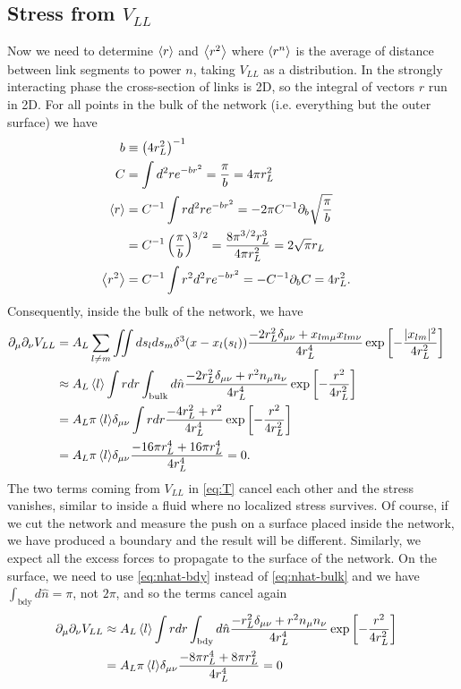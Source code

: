 \documentclass[endfloats,nofootinbib,preprint,floatfix,titlepage,superscriptaddress,linenumbers]{revtex4-1} %
\begin{document}
\subsection{Stress from $V_{LL}$}
Now we need to determine $\left<r\right>$ and $\left<r^2\right>$ where $\left<r^n\right>$ is the average of distance between link segments to power $n$, taking $V_{LL}$ as a distribution. 
In the strongly interacting phase the %
cross-section of links is 2D, so the integral of vectors $r$ run in 2D. 
For all points in the bulk of the network (i.e. everything but the outer surface) we have
\begin{align}
b &\equiv \left(4r_L^2\right)^{-1}\cr
C &= \int d^2 r e^{-br^2} = {\pi\over b} = 4\pi r_L^2 \cr
\left<r\right> &= C^{-1}\int r d^2 r e^{-br^2} = - 2\pi C^{-1}\partial_b \sqrt{{\pi\over b}} \cr &= C^{-1} \left({\pi\over b}\right)^{3/2}    = {8\pi^{3/2} r_L^3\over 4 \pi r_L^2} = 2\sqrt{\pi} r_L \cr
\left<r^2\right> &= C^{-1}\int r^2 d^2 r e^{-b r^2} = - C^{-1}\partial_b C = 4r_L^2.
\end{align}
%
Consequently, inside the bulk of the network, we have 
\begin{align}
    \partial_\mu\partial_\nu V_{LL} & = A_L\sum_{l\ne m} \iint ds_l ds_m \delta^3(x-x_l(s_l))\frac{-2r_L^2\delta_{\mu\nu}+ x_{lm\mu} x_{lm\nu}}{4r_L^4}
    \exp\left[- {|x_{lm}|^2 \over 4 r_L^2}\right]\cr 
    & \approx {A_L\left<l\right>} \int r dr \int_\mathrm{bulk} d\hat{n} \frac{-2r_L^2\delta_{\mu\nu}+ r^2 n_\mu n_\nu}{4r_L^4}
    \exp\left[- {r^2 \over 4 r_L^2}\right]\cr
    &= {A_L\pi\left<l\right>} \delta_{\mu\nu} \int r dr  \frac{-4 r_L^2+ r^2 }{4r_L^4}
    \exp\left[- {r^2 \over 4 r_L^2}\right]\cr
    &= {A_L\pi\left<l\right>} \delta_{\mu\nu}  \frac{-16\pi r_L^4+ 16\pi r_L^4 }{4r_L^4} = 0 .
    \label{eq:stress-bulk}
\end{align}
The two terms coming from $V_{LL}$ in \eqref{eq:T} cancel each other and the stress vanishes, similar to inside a fluid where no localized stress survives. 
Of course, if we cut the network and measure the push on a surface placed inside the network, we have produced a boundary and the result will be different. 
Similarly, we expect all the excess forces to propagate to the surface of the network. 
On the surface, we need to use \eqref{eq:nhat-bdy}  instead of \eqref{eq:nhat-bulk} and we have $\int_\mathrm{bdy} d\hat{n} = \pi $, not $2\pi$, and so the terms cancel again
\begin{align}
    \ro_\mu\ro_\nu V_{LL} 
    & \approx {A_L\be{l}} \int r dr \int_\mathrm{bdy} d\hat{n} \frac{-r_L^2\delta_{\mu\nu}+ r^2 n_\mu n_\nu}{4r_L^4}
    \exp\left[- {r^2 \over 4 r_L^2}\right]\cr
    &= {A_L\pi\be{l}} \delta_{\mu\nu}  \frac{-8\pi r_L^4+ 8\pi r_L^2 }{4r_L^4} =0%
    \label{eq:stress-bdy}
\end{align}
\end{document}
